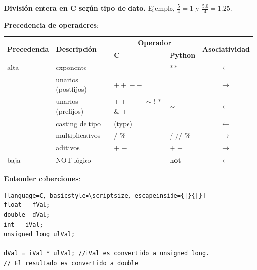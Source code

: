 \documentclass{article}
\begin{document}
\begin{itemize}
\begin{minipage}[h]{0.45\textwidth}
\textbf{División entera en C según tipo de dato.} Ejemplo, $\frac{5}{4} = 1$ y $\frac{5.0}{4} = 1.25 $. 
\end{minipage}

\item \textbf{Precedencia de operadores}:

\begin{center}
\begin{tabular}{|l|l||l|l|c|}\hline 
	\multirow{2}{*}{\textbf{Precedencia}}  & \multirow{2}{*}{\textbf{Descripción}} & 
	\multicolumn{2}{|c|}{\textbf{Operador}} & \multirow{2}{*}{\textbf{Asociatividad}} \\ \hhline{~~--~}
	& & \textbf{C} & \textbf{Python} &  \\ \hline \hline
	alta & exponente &  & $**$ & $\leftarrow$  \\	\hline
	& unarios (postfijos) & \tiny $++$ $--$ &  & $\rightarrow$ \\	\hline
	& unarios (prefijos) & \tiny$++$ $--$ $\sim$ ! * \& + - & \tiny $\sim$ + - & $\leftarrow$ \\	\hline
	& casting de tipo &(type) & & $\leftarrow$ \\	\hline
	& multiplicativos & \tiny * / \% & \tiny * / // \%	 & $\rightarrow$  \\	\hline
	& aditivos & \tiny $+$ $-$ & \tiny $+$ $-$ & $\rightarrow$  \\	\hline
	baja & NOT lógico  &	& $\mathbf{not}$ & $\leftarrow$ \\	\hline
\end{tabular}
\end{center}

\bigskip
\begin{minipage}[h]{0.45\textwidth}
\item \textbf{Entender coherciones}:
\begin{lstlisting}[language=C, basicstyle=\scriptsize, escapeinside={|}{|}]
float   fVal;
double  dVal;
int   iVal;
unsigned long ulVal;

dVal = iVal * ulVal; //iVal es convertido a unsigned long.
// El resultado es convertido a double 


\end{lstlisting}
\end{minipage}
\end{itemize}
\end{document}
